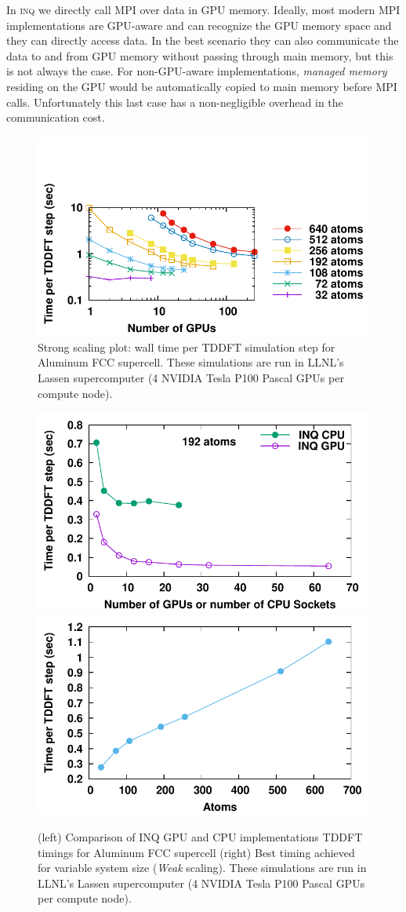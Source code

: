 In \textsc{inq} we directly call \textsc{MPI} over data in GPU memory.
Ideally, most modern \textsc{MPI} implementations are GPU-aware and can recognize the GPU memory space and they can directly access data.
In the best scenario they can also communicate the data to and from GPU memory without passing through main memory, but this is not always the case.
For non-GPU-aware implementations, \emph{managed memory} residing on the GPU would be automatically copied to main memory before \textsc{MPI} calls.
Unfortunately this last case has a non-negligible overhead in the communication cost.

\begin{figure}[h]
	\centering
	\includegraphics[width=0.5\linewidth]{figures/scaling/strong}
	\caption{
		Strong scaling plot: wall time per TDDFT simulation step for Aluminum FCC supercell.
		These simulations are run in LLNL's Lassen supercomputer (4 NVIDIA Tesla P100 Pascal GPUs per compute node).
	}
	\label{fig:scaling_strong}
\end{figure}

\begin{figure}[h]
	\centering
	\includegraphics[width=0.45\linewidth]{figures/scaling/gpu_vs_cpu}
	\includegraphics[width=0.45\linewidth]{figures/scaling/weak}
	\caption{
		(left)  Comparison of INQ GPU and CPU implementations TDDFT timings for Aluminum FCC supercell
		(right) Best timing achieved for variable system size (\emph{Weak} scaling).
		These simulations are run in LLNL's Lassen supercomputer (4 NVIDIA Tesla P100 Pascal GPUs per compute node).
	}
	\label{fig:scaling_gpu_vs_cpu}
	\label{fig:scaling_weak}
\end{figure}

